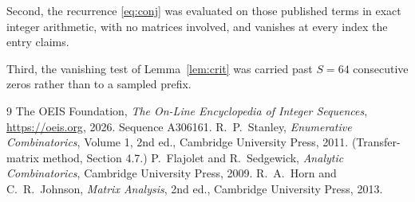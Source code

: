 \documentclass[11pt,a4paper]{article}
\theoremstyle{plain}
\theoremstyle{definition}
\begin{document}
Second, the recurrence \eqref{eq:conj} was evaluated on those published terms in exact
integer arithmetic, with no matrices involved, and vanishes at every index the entry claims.

Third, the vanishing test of Lemma~\ref{lem:crit} was carried past $S=64$ consecutive
zeros rather than to a sampled prefix.

\begin{thebibliography}{9}
 The OEIS Foundation, \emph{The On-Line Encyclopedia of Integer
Sequences}, \url{https://oeis.org}, 2026. Sequence A306161.
 R.~P.~Stanley, \emph{Enumerative Combinatorics}, Volume 1, 2nd ed.,
Cambridge University Press, 2011. (Transfer-matrix method, Section 4.7.)
 P.~Flajolet and R.~Sedgewick, \emph{Analytic Combinatorics}, Cambridge
University Press, 2009.
 R.~A.~Horn and C.~R.~Johnson, \emph{Matrix Analysis}, 2nd ed., Cambridge
University Press, 2013.
\end{thebibliography}
\end{document}
